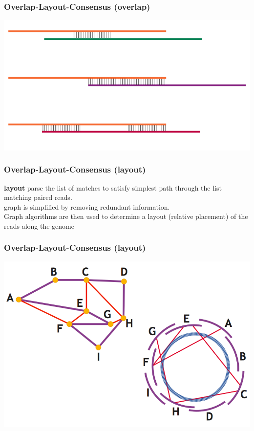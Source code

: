 \documentclass[pdf]{beamer}
\begin{document}
\begin{frame}
\frametitle{Overlap-Layout-Consensus (overlap)}
\begin{center}
\includegraphics[scale=0.5]{Figures/overlap.png}
\end{center}
\end{frame}
 
\begin{frame}
\frametitle{Overlap-Layout-Consensus (layout)}
\textbf{layout}
parse the list of matches to satisfy simplest path through the list matching paired reads.\\
graph is simplified by removing redundant information.\\
Graph algorithms are then used to determine a layout (relative placement) of the reads along the genome
\end{frame}


\begin{frame}
\frametitle{Overlap-Layout-Consensus (layout)}
\begin{center}
\includegraphics[scale=0.35]{Figures/layout.png}
\end{center}
\end{frame}
\end{document}
